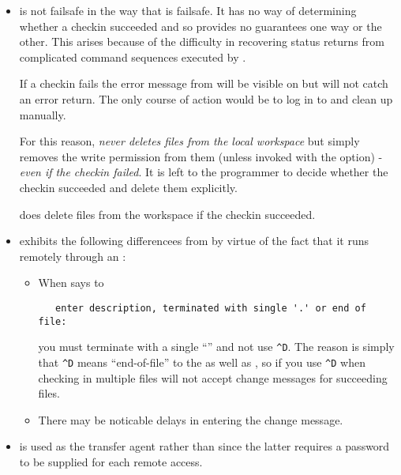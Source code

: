 \begin{itemize}
\item
    is not failsafe in the way that  is failsafe.  It has
   no way of determining whether a checkin succeeded and so provides no
   guarantees one way or the other.  This arises because of the difficulty in
   recovering status returns from complicated command sequences executed by
   .

   If a checkin fails the error message from  will be visible on
    but  will not catch an error return.  The only
   course of action would be to log in to  and clean up
   manually.

   For this reason,  \emph{never deletes files from the local
   workspace} but simply removes the write permission from them (unless
   invoked with the  option) - \emph{even if the checkin failed}.  It
   is left to the programmer to decide whether the checkin succeeded and
   delete them explicitly.

    does delete files from the  workspace if the
   checkin succeeded.

\item
    exhibits the following differencees from  by virtue
   of the fact that it runs  remotely through an :

   \begin{itemize}
   \item
      When  says to

\begin{verbatim}
   enter description, terminated with single '.' or end of file:
\end{verbatim}

      you must terminate with a single ``'' and not use \verb+^D+.
      The reason is simply that \verb+^D+ means ``end-of-file'' to the
       as well as , so if you use \verb+^D+ when
      checking in multiple files  will not accept change messages
      for succeeding files.

   \item
      There may be noticable delays in entering the change message.
   \end{itemize}

\item
    is used as the transfer agent rather than  since
   the latter requires a password to be supplied for each remote access. 
\end{itemize}

